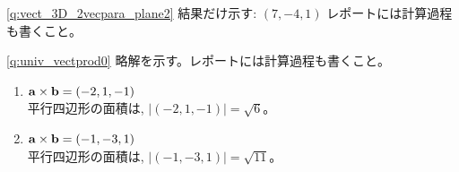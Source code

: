 \ref{q:vect_3D_2vecpara_plane2} 結果だけ示す: $(7, -4, 1)$
レポートには計算過程も書くこと。\hv




\ref{q:univ_vectprod0} 
略解を示す。レポートには計算過程も書くこと。
\begin{enumerate}
\item ${\bf a}\times{\bf b}=(-2,1,-1)$\\
平行四辺形の面積は, $|(-2,1,-1)|=\sqrt{6}$。
\item ${\bf a}\times{\bf b}=(-1,-3,1)$\\
平行四辺形の面積は, $|(-1,-3,1)|=\sqrt{11}$。
\end{enumerate}
\hv



